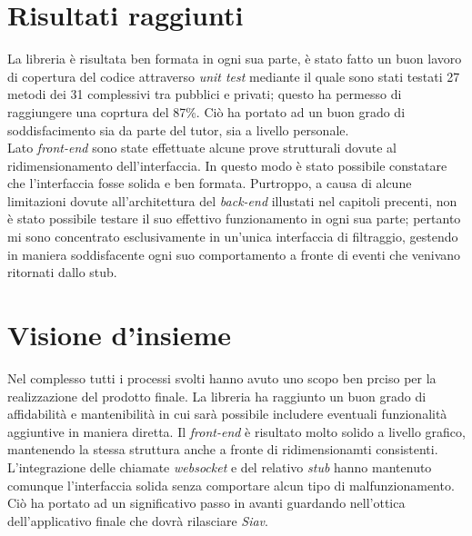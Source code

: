 \section{Risultati raggiunti}
La libreria è risultata ben formata in ogni sua parte, è stato fatto un buon lavoro di copertura del codice attraverso \textit{\gls{unit test}} mediante il quale sono stati testati 27 metodi dei 31 complessivi tra pubblici e privati; questo ha permesso di raggiungere una coprtura del 87\%. Ciò ha portato ad un buon grado di soddisfacimento sia da parte del tutor, sia a livello personale.\\
Lato \textit{front-end} sono state effettuate alcune prove strutturali dovute al ridimensionamento dell'interfaccia. In questo modo è stato possibile constatare che l'interfaccia fosse solida e ben formata. Purtroppo, a causa di alcune limitazioni dovute all'architettura del \textit{back-end} illustati nel capitoli precenti, non è stato possibile testare il suo effettivo funzionamento in ogni sua parte; pertanto mi sono concentrato esclusivamente in un'unica interfaccia di filtraggio, gestendo in maniera soddisfacente ogni suo comportamento a fronte di eventi che venivano ritornati dallo stub.
\section{Visione d'insieme}
Nel complesso tutti i processi svolti hanno avuto uno scopo ben prciso per la realizzazione del prodotto finale. La libreria ha raggiunto un buon grado di affidabilità e mantenibilità in cui sarà possibile includere eventuali funzionalità aggiuntive in maniera diretta. Il \textit{front-end} è risultato molto solido a livello grafico, mantenendo la stessa struttura anche a fronte di ridimensionamti consistenti. L'integrazione delle chiamate \textit{websocket} e del relativo \textit{stub} hanno mantenuto comunque l'interfaccia solida senza comportare alcun tipo di malfunzionamento. Ciò ha portato ad un significativo passo in avanti guardando nell'ottica dell'applicativo finale che dovrà rilasciare \textit{Siav}.